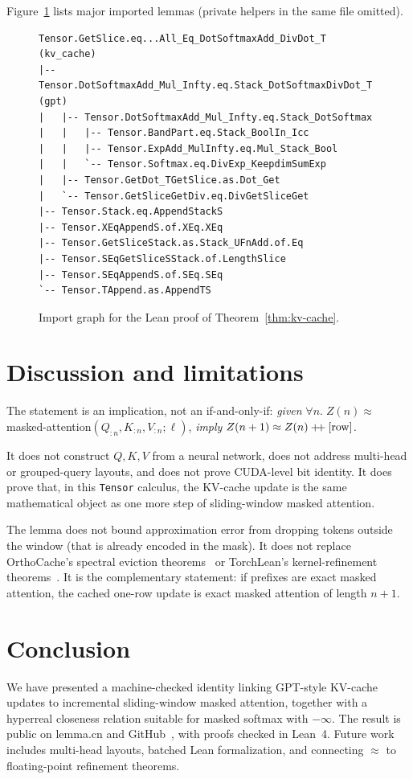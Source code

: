 \documentclass[11pt,a4paper]{article}
\newcommand{\rowop}{\operatorname{row}}
\newcommand{\concat}{\mathbin{+\mkern-4mu+}}
\newcommand{\XEq}{\approx}
\begin{document}
Figure~\ref{fig:deps} lists major imported lemmas (private helpers in the same file omitted).

\begin{figure}[ht]
\small
\begin{verbatim}
Tensor.GetSlice.eq...All_Eq_DotSoftmaxAdd_DivDot_T  (kv_cache)
|-- Tensor.DotSoftmaxAdd_Mul_Infty.eq.Stack_DotSoftmaxDivDot_T  (gpt)
|   |-- Tensor.DotSoftmaxAdd_Mul_Infty.eq.Stack_DotSoftmax
|   |   |-- Tensor.BandPart.eq.Stack_BoolIn_Icc
|   |   |-- Tensor.ExpAdd_MulInfty.eq.Mul_Stack_Bool
|   |   `-- Tensor.Softmax.eq.DivExp_KeepdimSumExp
|   |-- Tensor.GetDot_TGetSlice.as.Dot_Get
|   `-- Tensor.GetSliceGetDiv.eq.DivGetSliceGet
|-- Tensor.Stack.eq.AppendStackS
|-- Tensor.XEqAppendS.of.XEq.XEq
|-- Tensor.GetSliceStack.as.Stack_UFnAdd.of.Eq
|-- Tensor.SEqGetSliceSStack.of.LengthSlice
|-- Tensor.SEqAppendS.of.SEq.SEq
`-- Tensor.TAppend.as.AppendTS
\end{verbatim}
\caption{Import graph for the Lean proof of Theorem~\ref{thm:kv-cache}.}
\label{fig:deps}
\end{figure}

\section{Discussion and limitations}
\label{sec:discussion}

The statement is an implication, not an if-and-only-if:
\emph{given} $\forall n.\; Z(n)\XEq$ masked-attention$(Q_{:n},K_{:n},V_{:n};\ell)$,
\emph{imply} $Z(n+1)\XEq Z(n)\concat[\rowop]$.

It does not construct $Q,K,V$ from a neural network, does not address multi-head or grouped-query layouts, and does not prove CUDA-level bit identity.
It does prove that, in this \texttt{Tensor} calculus, the KV-cache update is the same mathematical object as one more step of sliding-window masked attention.

The lemma does not bound approximation error from dropping tokens outside the window (that is already encoded in the mask).
It does not replace OrthoCache's spectral eviction theorems~\cite{orthocache} or TorchLean's kernel-refinement theorems~\cite{torchlean}.
It is the complementary statement: if prefixes are exact masked attention, the cached one-row update is exact masked attention of length $n+1$.

\section{Conclusion}
\label{sec:conclusion}

We have presented a machine-checked identity linking GPT-style KV-cache updates to incremental sliding-window masked attention, together with a hyperreal closeness relation suitable for masked softmax with $-\infty$.
The result is public on lemma.cn and GitHub~\cite{lemma_repo}, with proofs checked in Lean~4.
Future work includes multi-head layouts, batched Lean formalization, and connecting $\XEq$ to floating-point refinement theorems.



\end{document}
